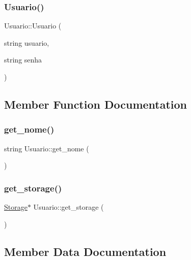 \mbox{\label{classUsuario_a0cde516a7cd7901bd255c0d5552b67cb}} 
\subsubsection{\texorpdfstring{Usuario()}{Usuario()}\hspace{0.1cm}{\footnotesize\ttfamily [2/2]}}
{\footnotesize\ttfamily Usuario\+::\+Usuario (\begin{DoxyParamCaption}\item[{string}]{usuario,  }\item[{string}]{senha }\end{DoxyParamCaption})}



\subsection{Member Function Documentation}
\mbox{\label{classUsuario_a65e8e43842bcaa429a4f971b2b950e2c}} 
\subsubsection{\texorpdfstring{get\+\_\+nome()}{get\_nome()}}
{\footnotesize\ttfamily string Usuario\+::get\+\_\+nome (\begin{DoxyParamCaption}{ }\end{DoxyParamCaption})}

\mbox{\label{classUsuario_a29f0b4619fc682fdfa3f53c7488b3a33}} 
\subsubsection{\texorpdfstring{get\+\_\+storage()}{get\_storage()}}
{\footnotesize\ttfamily \hyperlink{classStorage}{Storage}$\ast$ Usuario\+::get\+\_\+storage (\begin{DoxyParamCaption}{ }\end{DoxyParamCaption})}



\subsection{Member Data Documentation}
\mbox{\label{classUsuario_a1f8c614f94b3ac85915bf27aedd86ffb}} 
